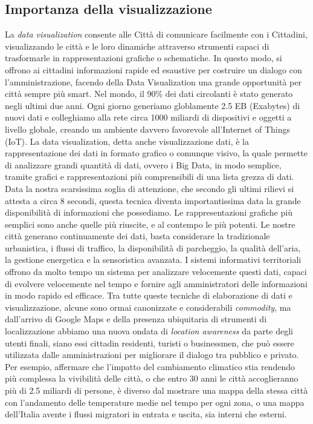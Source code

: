\subsection{Importanza della visualizzazione}
La \textit{data visualization} consente alle Città di comunicare facilmente con i Cittadini, visualizzando le città e le loro dinamiche attraverso strumenti capaci di trasformarle in rappresentazioni grafiche o schematiche. In questo modo, si offrono ai cittadini informazioni rapide ed esaustive per costruire un dialogo con l'amministrazione, facendo della Data Visualization una grande opportunità per città sempre più smart.
Nel mondo, il 90\% dei dati circolanti è stato generato negli ultimi due anni. Ogni giorno generiamo globlamente 2.5 EB (Exabytes) di nuovi dati e colleghiamo alla rete circa 1000 miliardi di dispositivi e oggetti a livello globale, creando un ambiente davvero favorevole all'Internet of Things (IoT).
La data visualization, detta anche visualizzazione dati, è la rappresentazione dei dati in formato grafico o comunque visivo, la quale permette di analizzare grandi quantità di dati, ovvero i Big Data, in modo semplice, tramite grafici e rappresentazioni più comprensibili di una lista grezza di dati. Data la nostra scarsissima soglia di attenzione, che secondo gli ultimi rilievi si attesta a circa 8 secondi, questa tecnica diventa importantissima data la grande disponibilità di informazioni che possediamo. Le rappresentazioni grafiche più semplici sono anche quelle più riuscite, e al contempo le più potenti.
Le nostre città generano continuamente dei dati, basta considerare la tradizionale urbanistica, i flussi di traffico, la disponibilità di parcheggio, la qualità dell'aria, la gestione energetica e la sensoristica avanzata. I sistemi informativi territoriali offrono da molto tempo un sistema per analizzare velocemente questi dati, capaci di evolvere velocemente nel tempo e fornire agli amministratori delle informazioni in modo rapido ed efficace. Tra tutte queste tecniche di elaborazione di dati e visualizzazione, alcune sono ormai canonizzate e considerabili \textit{commodity}, ma dall'arrivo di Google Maps e della presenza ubiquitaria di strumenti di localizzazione abbiamo una nuova ondata di \textit{location awareness} da parte degli utenti finali, siano essi cittadin residenti, turisti o businessmen, che può essere utilizzata dalle amministrazioni per migliorare il dialogo tra pubblico e privato.
Per esempio, affermare che l'impatto del cambiamento climatico stia rendendo più complessa la vivibilità delle città, o che entro 30 anni le città accoglieranno più di 2.5 miliardi di persone, è diverso dal mostrare una mappa della stessa città con l'andamento delle temperature medie nel tempo per ogni zona, o una mappa dell'Italia avente i flussi migratori in entrata e uscita, sia interni che esterni.
